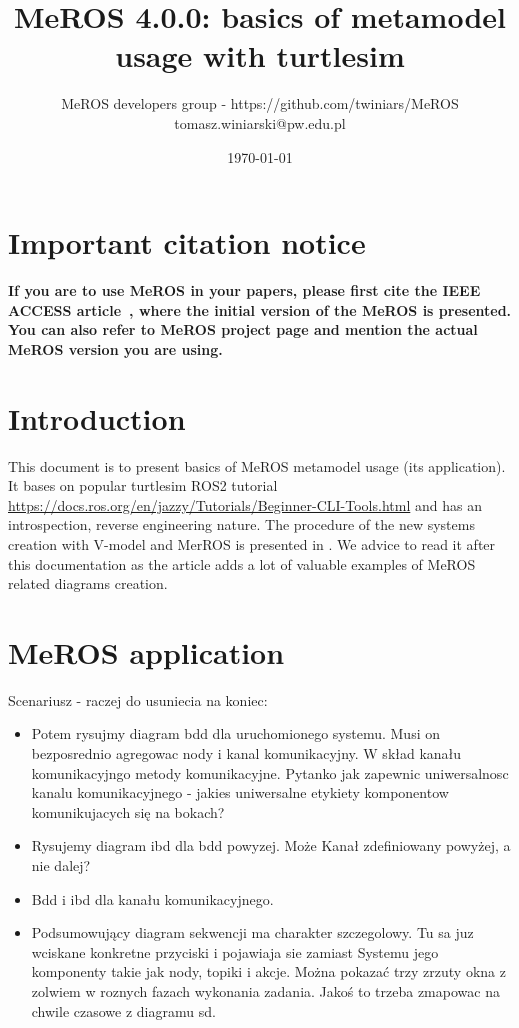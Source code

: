 \documentclass[11pt,oneside,a4paper]{report}
\begin{document}
	
\title{MeROS 4.0.0: basics of metamodel usage with turtlesim}
\author{MeROS developers group - https://github.com/twiniars/MeROS \\ tomasz.winiarski@pw.edu.pl}
\date{\today}
\maketitle

	
	
	\maketitle
	

	
\chapter*{Important citation notice}

\textbf{If you are to use MeROS in your papers, please first cite the IEEE ACCESS  article~\cite{meros-access}, where the initial version of the MeROS is presented. You can also refer to MeROS project page \cite{meros-www} and mention the actual MeROS version you are using.}
	
\chapter{Introduction}
\label{ch:introduction}

	This document is to present basics of MeROS metamodel usage (its application). It bases on popular turtlesim ROS2 tutorial \url{https://docs.ros.org/en/jazzy/Tutorials/Beginner-CLI-Tools.html} and has an introspection, reverse engineering nature. The procedure of the new systems creation with V-model and MerROS is presented in \cite{winiarski2025-v-model}. We advice to read it after this documentation as the article adds a lot of valuable examples of MeROS related diagrams creation. 

\chapter{MeROS application}
\label{ch:application}
Scenariusz - raczej do usuniecia na koniec:
\begin{itemize}
	\item Potem rysujmy diagram bdd dla uruchomionego systemu. Musi on bezposrednio agregowac nody i kanal komunikacyjny. W skład kanału komunikacyjngo metody komunikacyjne. Pytanko jak zapewnic uniwersalnosc kanalu komunikacyjnego - jakies uniwersalne etykiety komponentow komunikujacych się na bokach?
	\item Rysujemy diagram ibd dla bdd powyzej. Może Kanał zdefiniowany powyżej, a nie dalej?
	\item Bdd i ibd dla kanału komunikacyjnego.
	\item Podsumowujący diagram sekwencji ma charakter szczegolowy. Tu sa juz wciskane konkretne przyciski i pojawiaja sie zamiast Systemu jego komponenty takie jak nody, topiki i akcje. Można pokazać trzy zrzuty okna z zolwiem w roznych fazach wykonania zadania. Jakoś to trzeba zmapowac na chwile czasowe z diagramu sd.
\end{itemize}
\end{document}
